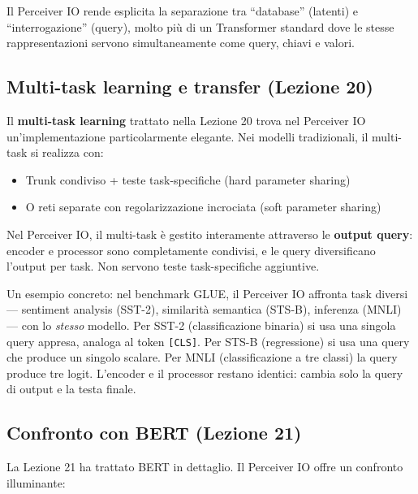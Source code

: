 \documentclass[12pt,a4paper]{article}
\begin{document}
Il Perceiver IO rende esplicita la separazione tra ``database'' (latenti) e ``interrogazione'' (query), molto pi\`u di un Transformer standard dove le stesse rappresentazioni servono simultaneamente come query, chiavi e valori.

\subsection{Multi-task learning e transfer (Lezione 20)}

Il \textbf{multi-task learning} trattato nella Lezione 20 trova nel Perceiver IO un'implementazione particolarmente elegante. Nei modelli tradizionali, il multi-task si realizza con:
\begin{itemize}
    \item Trunk condiviso + teste task-specifiche (hard parameter sharing)
    \item O reti separate con regolarizzazione incrociata (soft parameter sharing)
\end{itemize}

Nel Perceiver IO, il multi-task \`e gestito interamente attraverso le \textbf{output query}: encoder e processor sono completamente condivisi, e le query diversificano l'output per task. Non servono teste task-specifiche aggiuntive.

Un esempio concreto: nel benchmark GLUE, il Perceiver IO affronta task diversi --- sentiment analysis (SST-2), similarit\`a semantica (STS-B), inferenza (MNLI) --- con lo \emph{stesso} modello. Per SST-2 (classificazione binaria) si usa una singola query appresa, analoga al token \texttt{[CLS]}. Per STS-B (regressione) si usa una query che produce un singolo scalare. Per MNLI (classificazione a tre classi) la query produce tre logit. L'encoder e il processor restano identici: cambia solo la query di output e la testa finale.

\subsection{Confronto con BERT (Lezione 21)}

La Lezione 21 ha trattato BERT in dettaglio. Il Perceiver IO offre un confronto illuminante:
\end{document}

